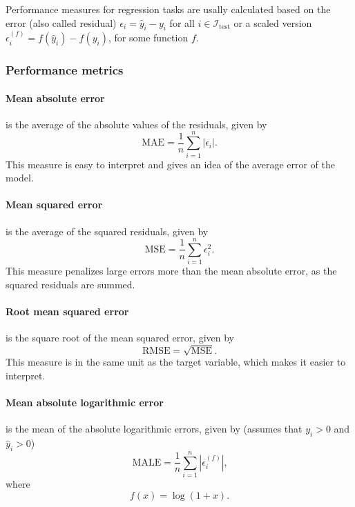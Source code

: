 Performance measures for regression tasks are usally calculated based on the error (also
called residual) $\epsilon_i = \hat{y}_i - y_i$ for all $i \in \mathcal{I}_\text{test}$ or
a scaled version $\epsilon_i^{(f)} = f(\hat{y}_i) - f(y_i)$, for some function $f$.

\subsubsection{Performance metrics}

\paragraph{Mean absolute error} is the average of the absolute values of the residuals,
given by
\begin{equation*}
  \text{MAE} = \frac{1}{n} \sum_{i=1}^n | \epsilon_i |\text{.}
\end{equation*}
This measure is easy to interpret and gives an idea of the average error of the model.

\paragraph{Mean squared error} is the average of the squared residuals, given by
\begin{equation*}
  \text{MSE} = \frac{1}{n} \sum_{i=1}^n \epsilon_i^2\text{.}
\end{equation*}
This measure penalizes large errors more than the mean absolute error, as the squared
residuals are summed.

\paragraph{Root mean squared error} is the square root of the mean squared error, given by
\begin{equation*}
  \text{RMSE} = \sqrt{\text{MSE}}\text{.}
\end{equation*}
This measure is in the same unit as the target variable, which makes it easier to
interpret.

\paragraph{Mean absolute logarithmic error} is the mean of the absolute logarithmic errors,
given by (assumes that $y_i > 0$ and $\hat{y}_i > 0$)
\begin{equation*}
  \text{MALE} = \frac{1}{n} \sum_{i=1}^n | \epsilon_i^{(f)} |\text{,}
\end{equation*}
where \[
  f(x) = \log(1 + x)\text{.}
\]


